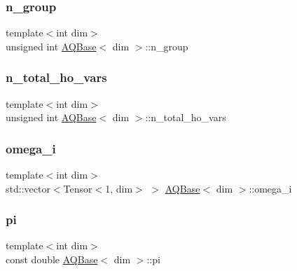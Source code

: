 \subsubsection{\texorpdfstring{n\+\_\+group}{n\_group}}
{\footnotesize\ttfamily template$<$int dim$>$ \\
unsigned int \hyperlink{class_a_q_base}{A\+Q\+Base}$<$ dim $>$\+::n\+\_\+group\hspace{0.3cm}{\ttfamily [protected]}}

\mbox{\label{class_a_q_base_a7169f8e3b53059317bb2144519f64be9}} 
\subsubsection{\texorpdfstring{n\+\_\+total\+\_\+ho\+\_\+vars}{n\_total\_ho\_vars}}
{\footnotesize\ttfamily template$<$int dim$>$ \\
unsigned int \hyperlink{class_a_q_base}{A\+Q\+Base}$<$ dim $>$\+::n\+\_\+total\+\_\+ho\+\_\+vars\hspace{0.3cm}{\ttfamily [protected]}}

\mbox{\label{class_a_q_base_a07aaf517b03be3f8405fd4063cf59231}} 
\subsubsection{\texorpdfstring{omega\+\_\+i}{omega\_i}}
{\footnotesize\ttfamily template$<$int dim$>$ \\
std\+::vector$<$Tensor$<$1, dim$>$ $>$ \hyperlink{class_a_q_base}{A\+Q\+Base}$<$ dim $>$\+::omega\+\_\+i\hspace{0.3cm}{\ttfamily [protected]}}

\mbox{\label{class_a_q_base_a002ce18f617db787616e60fba67899a9}} 
\subsubsection{\texorpdfstring{pi}{pi}}
{\footnotesize\ttfamily template$<$int dim$>$ \\
const double \hyperlink{class_a_q_base}{A\+Q\+Base}$<$ dim $>$\+::pi\hspace{0.3cm}{\ttfamily [protected]}}

